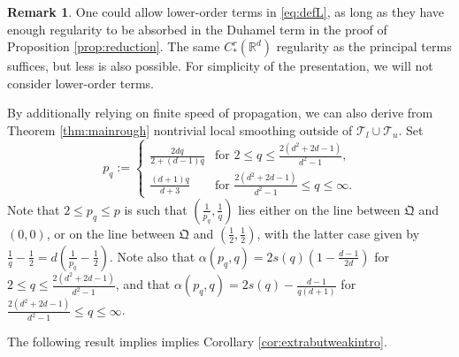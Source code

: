 \documentclass{amsart}
\numberwithin{equation}{section}
\theoremstyle{definition}
\newtheorem{remark}[theorem]{Remark}
\newcommand{\Rd}{\mathbb{R}^{d}}
\begin{document}
\begin{remark}\label{rem:lowerorder}
One could allow lower-order terms in \eqref{eq:defL}, as long as they have enough regularity to be absorbed in the Duhamel term in the proof of Proposition \ref{prop:reduction}. The same $C^{r}_{*}(\Rd)$ regularity as the principal terms suffices, but less is also possible. For simplicity of the presentation, we will not consider lower-order terms.
\end{remark}

By additionally relying on finite speed of propagation, we can also derive from Theorem \ref{thm:mainrough} nontrivial local smoothing outside of $\mathcal{T}_{l}\cup \mathcal{T}_{u}$. Set
\[
p_{q}:=
\begin{cases}
\frac{2dq}{2+(d-1)q}&\text{for }2\leq q\leq \frac{2(d^{2}+2d-1)}{d^{2}-1},\\
\frac{(d+1)q}{d+3}&\text{for }\frac{2(d^{2}+2d-1)}{d^{2}-1}\leq q\leq \infty.
\end{cases}
\]
Note that $2\leq p_{q}\leq p$ is such that $(\frac{1}{p_{q}},\frac{1}{q})$ lies either on the line between $\mathfrak{Q}$ and $(0,0)$, or on the line between $\mathfrak{Q}$ and $(\frac{1}{2},\frac{1}{2})$, with the latter case given by $\frac{1}{q}-\frac{1}{2}=d(\frac{1}{p_{q}}-\frac{1}{2})$. Note also that $\alpha(p_{q},q)=
2s(q)(1-\frac{d-1}{2d})$ for $2\leq q\leq \frac{2(d^{2}+2d-1)}{d^{2}-1}$, and that $\alpha(p_{q},q)=2s(q)-\frac{d-1}{q(d+1)}$ for $\frac{2(d^{2}+2d-1)}{d^{2}-1}\leq q\leq \infty$.

The following result implies implies Corollary \ref{cor:extrabutweakintro}.
\end{document}

